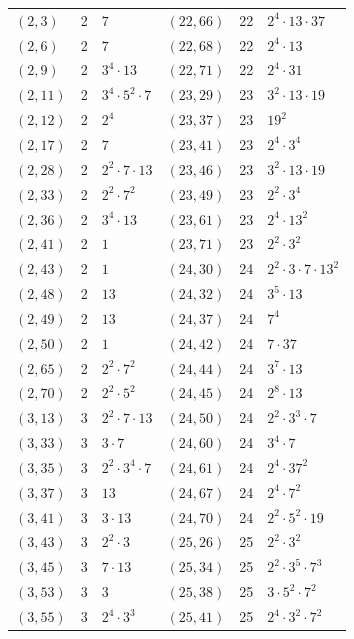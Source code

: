 \documentclass[11pt]{article}
\begin{document}
\begin{longtable}{@{}lrl@{\qquad}lrl@{}}
$(2,3)$ & 2 & $7$ & $(22,66)$ & 22 & $2^{4}\cdot 13\cdot 37$\\
$(2,6)$ & 2 & $7$ & $(22,68)$ & 22 & $2^{4}\cdot 13$\\
$(2,9)$ & 2 & $3^{4}\cdot 13$ & $(22,71)$ & 22 & $2^{4}\cdot 31$\\
$(2,11)$ & 2 & $3^{4}\cdot 5^{2}\cdot 7$ & $(23,29)$ & 23 & $3^{2}\cdot 13\cdot 19$\\
$(2,12)$ & 2 & $2^{4}$ & $(23,37)$ & 23 & $19^{2}$\\
$(2,17)$ & 2 & $7$ & $(23,41)$ & 23 & $2^{4}\cdot 3^{4}$\\
$(2,28)$ & 2 & $2^{2}\cdot 7\cdot 13$ & $(23,46)$ & 23 & $3^{2}\cdot 13\cdot 19$\\
$(2,33)$ & 2 & $2^{2}\cdot 7^{2}$ & $(23,49)$ & 23 & $2^{2}\cdot 3^{4}$\\
$(2,36)$ & 2 & $3^{4}\cdot 13$ & $(23,61)$ & 23 & $2^{4}\cdot 13^{2}$\\
$(2,41)$ & 2 & $1$ & $(23,71)$ & 23 & $2^{2}\cdot 3^{2}$\\
$(2,43)$ & 2 & $1$ & $(24,30)$ & 24 & $2^{2}\cdot 3\cdot 7\cdot 13^{2}$\\
$(2,48)$ & 2 & $13$ & $(24,32)$ & 24 & $3^{5}\cdot 13$\\
$(2,49)$ & 2 & $13$ & $(24,37)$ & 24 & $7^{4}$\\
$(2,50)$ & 2 & $1$ & $(24,42)$ & 24 & $7\cdot 37$\\
$(2,65)$ & 2 & $2^{2}\cdot 7^{2}$ & $(24,44)$ & 24 & $3^{7}\cdot 13$\\
$(2,70)$ & 2 & $2^{2}\cdot 5^{2}$ & $(24,45)$ & 24 & $2^{8}\cdot 13$\\
$(3,13)$ & 3 & $2^{2}\cdot 7\cdot 13$ & $(24,50)$ & 24 & $2^{2}\cdot 3^{3}\cdot 7$\\
$(3,33)$ & 3 & $3\cdot 7$ & $(24,60)$ & 24 & $3^{4}\cdot 7$\\
$(3,35)$ & 3 & $2^{2}\cdot 3^{4}\cdot 7$ & $(24,61)$ & 24 & $2^{4}\cdot 37^{2}$\\
$(3,37)$ & 3 & $13$ & $(24,67)$ & 24 & $2^{4}\cdot 7^{2}$\\
$(3,41)$ & 3 & $3\cdot 13$ & $(24,70)$ & 24 & $2^{2}\cdot 5^{2}\cdot 19$\\
$(3,43)$ & 3 & $2^{2}\cdot 3$ & $(25,26)$ & 25 & $2^{2}\cdot 3^{2}$\\
$(3,45)$ & 3 & $7\cdot 13$ & $(25,34)$ & 25 & $2^{2}\cdot 3^{5}\cdot 7^{3}$\\
$(3,53)$ & 3 & $3$ & $(25,38)$ & 25 & $3\cdot 5^{2}\cdot 7^{2}$\\
$(3,55)$ & 3 & $2^{4}\cdot 3^{3}$ & $(25,41)$ & 25 & $2^{4}\cdot 3^{2}\cdot 7^{2}$\\

\end{longtable}
\end{document}
